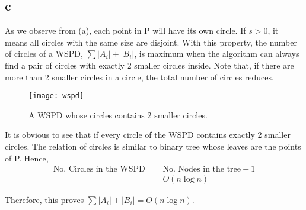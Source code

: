 \subsection*{c}
As we observe from (a), each point in P will have its own circle.
If $s > 0$, it means all circles with the same size are disjoint. With this property,
the number of circles of a WSPD, $\sum{|A_i|+|B_i|}$, is maximum when the algorithm
can always find a pair of circles with exactly 2 smaller circles inside.
Note that, if there are more than 2 smaller circles in a circle, the total number of circles reduces. \\

\begin{center}
    \label{figure1}
    \begin{figure}[h]
    \centering
    \texttt{[image: wspd]}\\
    \caption{A WSPD whose circles contains 2 smaller circles.} \label{fig:wspd}
    \end{figure}
\end{center}

It is obvious to see that if every circle of the WSPD contains exactly 2 smaller circles.
The relation of circles is similar to binary tree whose leaves are the points of P. Hence, \\

\begin{align*}
    \text{No. Circles in the WSPD} &= \text{No. Nodes in the tree} - 1 \\
    &= O(n\log{n})
\end{align*}

Therefore, this proves $\sum{|A_i|+|B_i|} = O(n\log{n})$.
